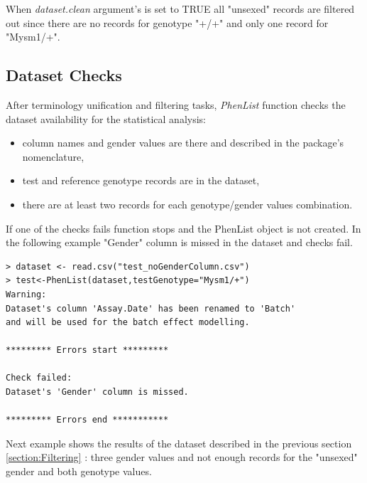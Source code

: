 \documentclass[12pt,a4paper]{article}
\begin{document}
When \textit{dataset.clean} argument's is set to TRUE all "unsexed" records are filtered out since there are no records for genotype "+\slash +" and only one record for "Mysm1\slash +".

\subsection{Dataset Checks}
\label{section:DatasetChecks}
After terminology unification and filtering tasks, \textit{PhenList} function checks the dataset availability for the statistical analysis: 
\begin{itemize}
\item column names and gender values are there and described in the package's nomenclature, 
\item test and reference genotype records are in the dataset, 
\item there are at least two records for each genotype\slash gender values combination.
\end{itemize}

If one of the checks fails function stops and the PhenList object is not created. In the following example "Gender" column is missed in the dataset and checks fail. 

\begingroup
    \fontsize{8pt}{12pt}\selectfont
\begin{verbatim}
> dataset <- read.csv("test_noGenderColumn.csv")
> test<-PhenList(dataset,testGenotype="Mysm1/+")
Warning:
Dataset's column 'Assay.Date' has been renamed to 'Batch' 
and will be used for the batch effect modelling.

********* Errors start *********

Check failed:
Dataset's 'Gender' column is missed.

********* Errors end ***********
\end{verbatim}
\endgroup

Next example shows the results of the dataset described in the previous section \ref{section:Filtering} : three gender values and not enough records for the "unsexed" gender and both genotype values.
\end{document}
